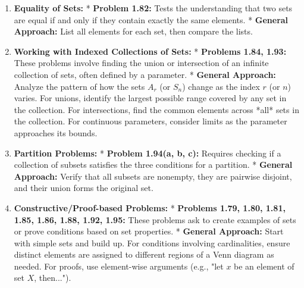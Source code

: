 \documentclass{article}
\begin{document}
\begin{itemize}
\begin{itemize}
\begin{itemize}
\begin{enumerate}
        *   \textbf{General Approach:} List all possible combinations of elements, including the empty set and the set itself. For $P(A)$, each element is a subset of $A$. Be careful when elements of a set are themselves sets (nested sets); they are treated as single, distinct objects for the purpose of forming subsets. Distinguish between an element $\in$ and a subset $\subseteq$.
    \item \textbf{Equality of Sets:}
        *   \textbf{Problem 1.82:} Tests the understanding that two sets are equal if and only if they contain exactly the same elements.
        *   \textbf{General Approach:} List all elements for each set, then compare the lists.
    \item \textbf{Working with Indexed Collections of Sets:}
        *   \textbf{Problems 1.84, 1.93:} These problems involve finding the union or intersection of an infinite collection of sets, often defined by a parameter.
        *   \textbf{General Approach:} Analyze the pattern of how the sets $A_r$ (or $S_n$) change as the index $r$ (or $n$) varies. For unions, identify the largest possible range covered by any set in the collection. For intersections, find the common elements across *all* sets in the collection. For continuous parameters, consider limits as the parameter approaches its bounds.
    \item \textbf{Partition Problems:}
        *   \textbf{Problem 1.94(a, b, c):} Requires checking if a collection of subsets satisfies the three conditions for a partition.
        *   \textbf{General Approach:} Verify that all subsets are nonempty, they are pairwise disjoint, and their union forms the original set.
    \item \textbf{Constructive/Proof-based Problems:}
        *   \textbf{Problems 1.79, 1.80, 1.81, 1.85, 1.86, 1.88, 1.92, 1.95:} These problems ask to create examples of sets or prove conditions based on set properties.
        *   \textbf{General Approach:} Start with simple sets and build up. For conditions involving cardinalities, ensure distinct elements are assigned to different regions of a Venn diagram as needed. For proofs, use element-wise arguments (e.g., "let $x$ be an element of set $X$, then...").


\end{enumerate}
\end{itemize}
\end{itemize}
\end{itemize}
\end{document}
